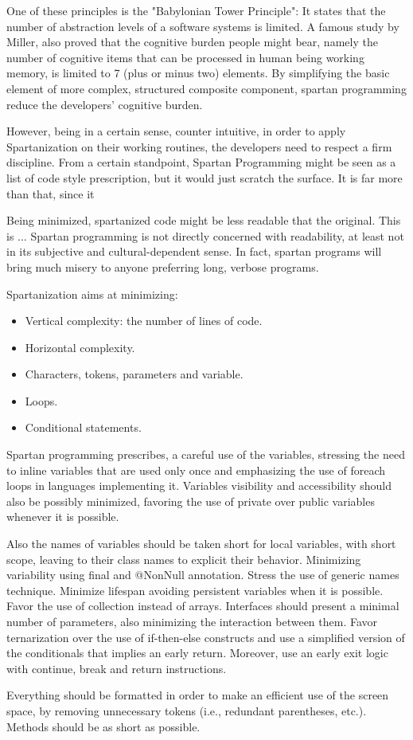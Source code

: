 One of these principles is the "Babylonian Tower Principle": It states that the
number of abstraction levels of a software systems is limited. A famous study
by Miller, also proved that the cognitive burden people might bear, namely the
number of cognitive items that can be processed in human being working memory,
is limited to 7 (plus or minus two) elements. By simplifying the basic element
of more complex, structured composite component, spartan programming reduce the
developers' cognitive burden.

However, being in a certain sense, counter intuitive, in order to apply
Spartanization on their working routines, the developers need to respect a firm
discipline. From a certain standpoint, Spartan Programming might be seen as a
list of code style prescription, but it would just scratch the surface. It is
far more than that, since it

Being minimized, spartanized code might be less readable that the original.
This is ... Spartan programming is not directly concerned with readability, at
least not in its subjective and cultural-dependent sense. In fact, spartan
programs will bring much misery to anyone preferring long, verbose programs.

Spartanization aims at minimizing:
\begin{itemize}
 \item Vertical complexity: the number of lines of code.
 \item Horizontal complexity.
 \item Characters, tokens, parameters and variable.
 \item Loops.
 \item Conditional statements.
\end{itemize}

Spartan programming prescribes, a careful use of the variables, stressing the need
to inline variables that are used only once and emphasizing the use of foreach loops
in languages implementing it. Variables visibility and accessibility should also be
possibly minimized, favoring the use of private over public variables whenever it
is possible.

Also the names of variables should be taken short for local variables, with short scope,
leaving to their class names to explicit their behavior. Minimizing variability using
final and @NonNull annotation. Stress the use of generic names technique. Minimize lifespan
avoiding persistent variables when it is possible. Favor the use of collection instead
of arrays. Interfaces should present a minimal number of parameters, also minimizing
the interaction between them. Favor ternarization over the use of if-then-else constructs
and use a simplified version of the conditionals that implies an early return. Moreover,
use an early exit logic with continue, break and return instructions.

Everything should be formatted in order to make an efficient use of the screen space,
by removing unnecessary tokens (i.e., redundant parentheses, etc.).
Methods should be as short as possible.
